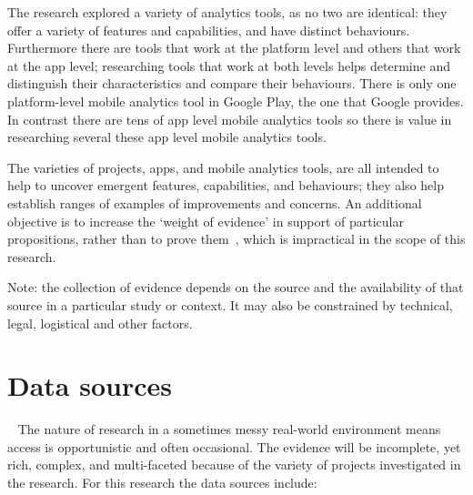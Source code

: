The research explored a variety of analytics tools, as no two are identical: they offer a variety of features and capabilities, and have distinct behaviours.  Furthermore there are tools that work at the platform level and others that work at the app level; researching tools that work at both levels helps determine and distinguish their characteristics and compare their behaviours. There is only one platform-level mobile analytics tool in Google Play, the one that Google provides. In contrast there are tens of app level mobile analytics tools so there is value in researching several these app level mobile analytics tools.

The varieties of projects, apps, and mobile analytics tools, are all intended to help to uncover emergent features, capabilities, and behaviours; they also help establish ranges of examples of improvements and concerns. An additional objective is to increase the `weight of evidence' in support of particular propositions, rather than to prove them~\citep[see p. 569]{seaman1999_qualitative_methods_in_esse}, which is impractical in the scope of this research.

Note: the collection of evidence depends on the source and the availability of that source in a particular study or context. It may also be constrained by technical, legal, logistical and other factors.

\section{Data sources}~\label{methodology-data-sources}
The nature of research in a sometimes messy real-world environment means access is opportunistic and often occasional. The evidence will be incomplete, yet rich, complex, and multi-faceted because of the variety of projects investigated in the research. For this research the data sources include:

